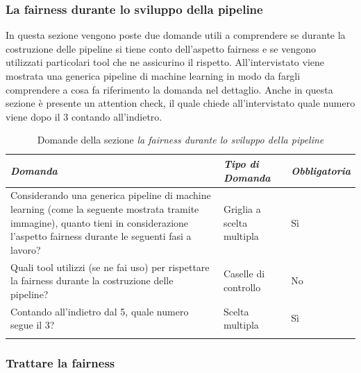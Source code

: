 \subsubsection{La fairness durante lo sviluppo della pipeline}

In questa sezione vengono poste due domande utili a comprendere se durante la costruzione delle pipeline si tiene conto dell'aspetto fairness e se vengono utilizzati particolari tool che ne assicurino il rispetto. All'intervistato viene mostrata una generica pipeline di machine learning in modo da fargli comprendere a cosa fa riferimento la domanda nel dettaglio. Anche in questa sezione è presente un attention check, il quale chiede all'intervistato quale numero viene dopo il 3 contando all'indietro.

\begin{longtable}{| p{} | p{} | p{} |} 
\hline\textbf{\textit{Domanda}} & \textbf{\textit{Tipo di Domanda}} & \textbf{\textit{Obbligatoria}}\\
\hline
\endhead 

\hline 
Considerando una generica pipeline di machine learning (come la seguente mostrata tramite immagine), quanto tieni in considerazione l'aspetto fairness durante le seguenti fasi a lavoro?

& Griglia a scelta multipla

& Sì 

\\ \hline
\rowcolor{Gray!30}

Quali tool utilizzi (se ne fai uso) per rispettare la fairness durante la costruzione delle pipeline?

&  Caselle di controllo

& No

\\ \hline

Contando all'indietro dal 5, quale numero segue il 3?

&  Scelta multipla

& Sì

\\ \hline 
\caption{Domande della sezione \emph{la fairness durante lo sviluppo della pipeline}} %
\label{tab:myfirstlongtable}
\end{longtable}

\subsubsection{Trattare la fairness}

